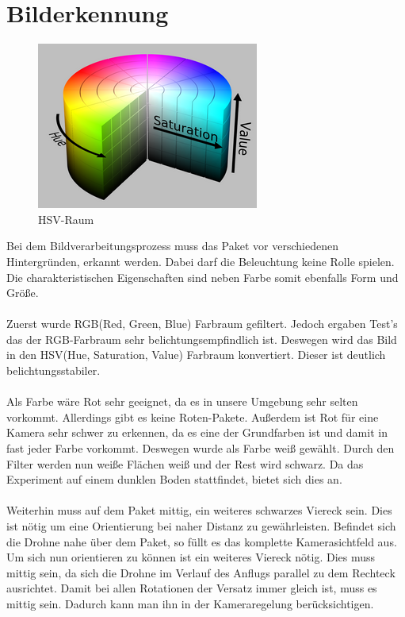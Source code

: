 \section{Bilderkennung}
\begin{figure}[h]
	\centering
	\includegraphics[scale=0.5]{"Grafiken/hsv_colorspace_zoom34.png"}
	\caption{HSV-Raum}
	\label{fig:meine-grafik}
\end{figure}
Bei dem Bildverarbeitungsprozess muss das Paket vor verschiedenen Hintergründen, erkannt werden. Dabei darf die Beleuchtung keine Rolle spielen. Die charakteristischen Eigenschaften sind neben Farbe somit ebenfalls Form und Größe.\\
\\
Zuerst wurde RGB(Red, Green, Blue) Farbraum gefiltert. Jedoch ergaben Test's das der RGB-Farbraum sehr belichtungsempfindlich ist. Deswegen wird das Bild in den HSV(Hue, Saturation, Value) Farbraum konvertiert. Dieser ist deutlich belichtungsstabiler.\\
\\
Als Farbe wäre Rot sehr geeignet, da es in unsere Umgebung sehr selten vorkommt. Allerdings gibt es keine Roten-Pakete. Außerdem ist Rot für eine Kamera sehr schwer zu erkennen, da es eine der Grundfarben ist und damit in fast jeder Farbe vorkommt. Deswegen wurde als Farbe weiß gewählt. Durch den Filter werden nun weiße Flächen weiß und der Rest wird schwarz. Da das Experiment auf einem dunklen Boden stattfindet, bietet sich dies an.\\
\\
Weiterhin muss auf dem Paket mittig, ein weiteres schwarzes Viereck sein. Dies ist nötig um eine Orientierung bei naher Distanz zu gewährleisten. Befindet sich die Drohne nahe über dem Paket, so füllt es das komplette Kamerasichtfeld aus. Um sich nun orientieren zu können ist ein weiteres Viereck nötig. Dies muss mittig sein, da sich die Drohne im Verlauf des Anflugs parallel zu dem Rechteck ausrichtet. Damit bei allen Rotationen der Versatz immer gleich ist, muss es mittig sein. Dadurch kann man ihn in der Kameraregelung berücksichtigen.\\

